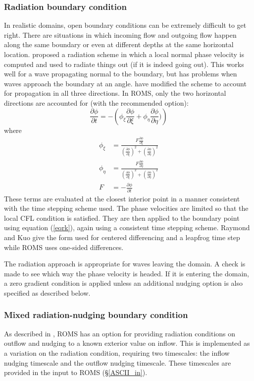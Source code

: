 \subsubsection{Radiation boundary condition}
In realistic domains, open boundary conditions can be extremely
difficult to get right. There are situations in which incoming flow and
outgoing flow happen along the same boundary or even at different
depths at the same horizontal location. \citet{Orlanski76}
proposed a radiation scheme in which a local normal phase velocity is
computed and used to radiate things out (if it is indeed going out).
This works well for a wave propagating normal to the boundary, but
has problems when waves approach the boundary at an angle.
\citet{Raymond84} have modified the scheme to account for
propagation in all three directions. In ROMS, only the two horizontal
directions are accounted for (with the recommended 
option):
\begin{equation}
   \frac{\partial \phi}{\partial t} = - \left( \phi_\xi \frac{\partial
   \phi}{\partial \xi} + \phi_\eta \frac{\partial \phi}{\partial \eta}) \right)
\label{eqrk}
\end{equation}
where
\begin{align}
   \phi_\xi & = \frac{F \frac{\partial \phi}{\partial \xi}}{
   \left( \frac{\partial \phi}{\partial \xi} \right)^2 +
   \left( \frac{\partial \phi}{\partial \eta} \right)^2 } \\
   \phi_\eta & = \frac{F \frac{\partial \phi}{\partial \eta}}{
   \left( \frac{\partial \phi}{\partial \xi} \right)^2 +
   \left( \frac{\partial \phi}{\partial \eta} \right)^2 } \\
   F & = - \frac{\partial \phi}{\partial t}
\end{align}
These terms are evaluated at the closest interior point in a manner
consistent with the time stepping scheme used. The phase velocities are
limited so that the local CFL condition is satisfied. They are then
applied to the boundary point using equation (\ref{eqrk}), again using
a consistent time stepping scheme. Raymond and Kuo give the form used
for centered differencing and a leapfrog time step while ROMS uses
one-sided differences.

The radiation approach is appropriate for waves leaving the domain. A
check is made to see which way the phase velocity is headed. If it
is entering the domain, a zero gradient condition is applied unless
an additional nudging option is also specified as described below.

\subsubsection{Mixed radiation-nudging boundary condition}
As described in \citep{Marchesiello2001}, ROMS has an option for providing
radiation conditions on outflow and nudging to a known exterior
value on inflow. This is implemented as a variation on the radiation
condition, requiring two timescales: the inflow nudging timescale and the
outflow nudging timescale. These timescales are provided in the input to
ROMS (\S\ref{ASCII_in}).
